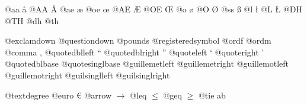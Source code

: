 \documentclass{book}
\begin{document}
@aa \aa{}
@AA \AA{}
@ae \ae{}
@oe \oe{}
@AE \AE{}
@OE \OE{}
@o \o{}
@O \O{}
@ss \ss{}
@l \l{}
@L \L{}
@DH \DH{}
@TH \TH{}
@dh \dh{}
@th \th{}

@exclamdown \textexclamdown{}
@questiondown \textquestiondown{}
@pounds \textsterling{}
@registeredsymbol \circledR{}
@ordf \textordfeminine{}
@ordm \textordmasculine{}
@comma ,
@quotedblleft \textquotedblleft{}
@quotedblright \textquotedblright{}
@quoteleft \textquoteleft{}
@quoteright \textquoteright{}
@quotedblbase \quotedblbase{}
@quotesinglbase \quotesinglbase{}
@guillemetleft \guillemotleft{}
@guillemetright \guillemotright{}
@guillemotleft \guillemotleft{}
@guillemotright \guillemotright{}
@guilsinglleft \guilsinglleft{}
@guilsinglright \guilsinglright{}

@textdegree \textdegree{}
@euro \euro{}
@arrow $\rightarrow{}$
@leq $\leq{}$
@geq $\geq{}$
@tie a\hbox{}b
\end{document}
